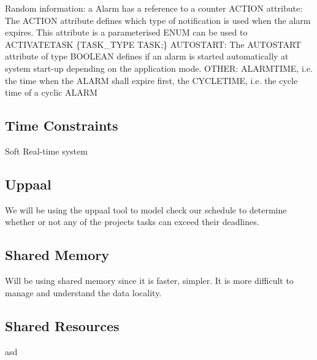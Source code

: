 \begin{itemize}
    Random information:
    a Alarm has a reference to a counter
    ACTION attribute: The ACTION attribute defines which type of notification is used when the alarm expires. This attribute is a parameterised ENUM can be used to ACTIVATETASK \{TASK\_TYPE TASK;\}
    AUTOSTART: The AUTOSTART attribute of type BOOLEAN defines if an alarm is started automatically at system start-up depending on the application mode. 
    OTHER:  ALARMTIME, i.e. the time when the ALARM shall expire first, the CYCLETIME, i.e. the cycle time of a cyclic ALARM 
\end{itemize}

\subsection{\textbf{Time Constraints}}
Soft Real-time system
\subsection{\textbf{Uppaal}}
We will be using the uppaal tool to model check our schedule to determine whether or not any of the projects tasks can exceed their deadlines.
\subsection{\textbf{Shared Memory}}
 Will be using shared memory since it is faster, simpler. It is more difficult to manage and understand the data locality.
\subsection{\textbf{Shared Resources}} 
 asd





